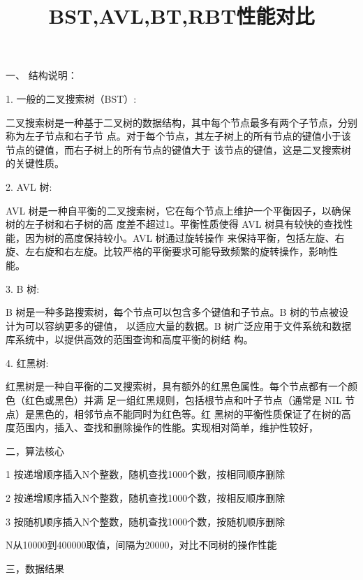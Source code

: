 \documentclass[]{article}
\title{BST,AVL,BT,RBT性能对比}
\author{}
\begin{document}
\maketitle


\begin{large}
	\heiti
	一、 结构说明：
\end{large}

1. 一般的二叉搜索树（BST）: 

二叉搜索树是一种基于二叉树的数据结构，其中每个节点最多有两个子节点，分别称为左子节点和右子节
点。对于每个节点，其左子树上的所有节点的键值小于该节点的键值，而右子树上的所有节点的键值大于
该节点的键值，这是二叉搜索树的关键性质。 

2. AVL 树: 

AVL 树是一种自平衡的二叉搜索树，它在每个节点上维护一个平衡因子，以确保树的左子树和右子树的高
度差不超过1。平衡性质使得 AVL 树具有较快的查找性能，因为树的高度保持较小。AVL 树通过旋转操作
来保持平衡，包括左旋、右旋、左右旋和右左旋。比较严格的平衡要求可能导致频繁的旋转操作，影响性
能。 

3. B 树: 

B 树是一种多路搜索树，每个节点可以包含多个键值和子节点。B 树的节点被设计为可以容纳更多的键值，
以适应大量的数据。B 树广泛应用于文件系统和数据库系统中，以提供高效的范围查询和高度平衡的树结
构。 

4. 红黑树: 

红黑树是一种自平衡的二叉搜索树，具有额外的红黑色属性。每个节点都有一个颜色（红色或黑色）并满
足一组红黑规则，包括根节点和叶子节点（通常是 NIL 节点）是黑色的，相邻节点不能同时为红色等。红
黑树的平衡性质保证了在树的高度范围内，插入、查找和删除操作的性能。实现相对简单，维护性较好，

\begin{large}
	\heiti
	二，算法核心
\end{large}

1 按递增顺序插入N个整数，随机查找1000个数，按相同顺序删除 

2 按递增顺序插入N个整数，随机查找1000个数，按相反顺序删除 

3 按随机顺序插入N个整数，随机查找1000个数，按随机顺序删除 

N从10000到400000取值，间隔为20000，对比不同树的操作性能 

\begin{large}
	\heiti
	三，数据结果 
\end{large}
\end{document}
